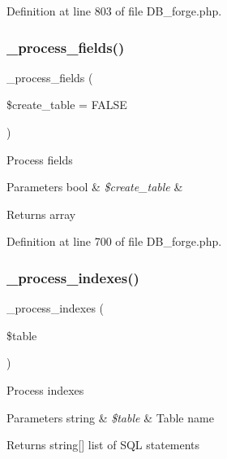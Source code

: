 Definition at line 803 of file D\+B\+\_\+forge.\+php.

\mbox{\label{class_c_i___d_b__forge_ae469322e7aad35ff5689973878175922}} 
\subsubsection{\texorpdfstring{\_process\_fields()}{\_process\_fields()}}
{\footnotesize\ttfamily \+\_\+process\+\_\+fields (\begin{DoxyParamCaption}\item[{}]{\$create\+\_\+table = {\ttfamily FALSE} }\end{DoxyParamCaption})\hspace{0.3cm}{\ttfamily [protected]}}

Process fields


\begin{DoxyParams}[1]{Parameters}
bool & {\em \$create\+\_\+table} & \\
\hline
\end{DoxyParams}
\begin{DoxyReturn}{Returns}
array 
\end{DoxyReturn}


Definition at line 700 of file D\+B\+\_\+forge.\+php.

\mbox{\label{class_c_i___d_b__forge_ae0bdb4ea3418590d1894c5b621b5ca50}} 
\subsubsection{\texorpdfstring{\_process\_indexes()}{\_process\_indexes()}}
{\footnotesize\ttfamily \+\_\+process\+\_\+indexes (\begin{DoxyParamCaption}\item[{}]{\$table }\end{DoxyParamCaption})\hspace{0.3cm}{\ttfamily [protected]}}

Process indexes


\begin{DoxyParams}[1]{Parameters}
string & {\em \$table} & Table name \\
\hline
\end{DoxyParams}
\begin{DoxyReturn}{Returns}
string\mbox{[}\mbox{]} list of S\+QL statements 
\end{DoxyReturn}


